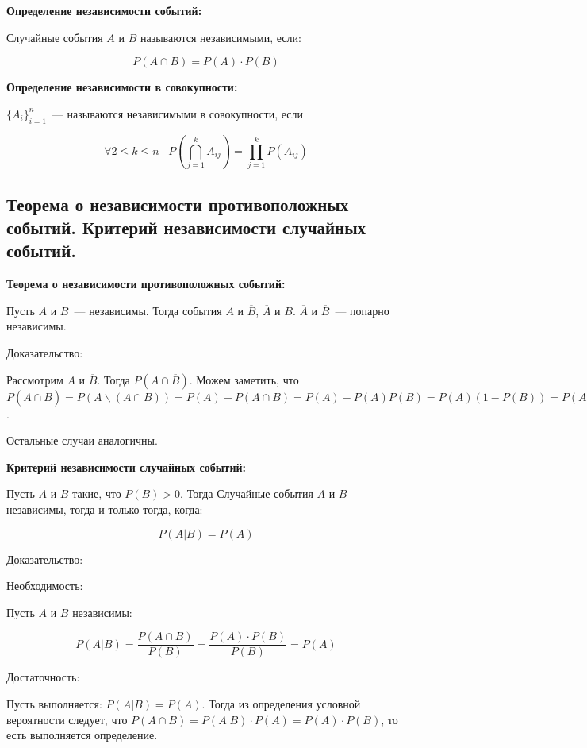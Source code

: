 \textbf{Определение независимости событий:}
    \smallskip

    Случайные события $A$ и $B$ называются независимыми, если:

    \[
        P(A \cap B) = P(A) \cdot P(B)   
    \]
    \bigskip

\textbf{Определение независимости в совокупности:}
    \smallskip

    $\{A_i\}^{n}_{i = 1}$~--- называются независимыми в совокупности, если

    \[
        \forall 2 \leq k \leq n \;\;\; P (\bigcap^{k}_{j = 1}A_{ij}) =
        \prod^{k}_{j = 1} P(A_{ij}) 
    \]

\subsection{Теорема о независимости противоположных событий. Критерий
независимости случайных событий.}

\textbf{Теорема о независимости противоположных событий:}
    \smallskip

    Пусть $A$ и $B$~--- независимы. Тогда события $A$ и $\overline{B}$,
    $\overline{A}$ и $B$. $\overline{A}$ и $\overline{B}$~--- попарно
    независимы.
    \bigskip

    Доказательство:
    \bigskip

    Рассмотрим $A$ и $\overline{B}$. Тогда $P(A \cap 
    \overline{B})$. Можем заметить, что $P(A \cap \overline{B}) = 
    P(A \backslash (A \cap B)) = P(A) - P(A \cap B) = P(A) - P(A) P(B) =
    P(A)(1 - P(B)) = P(A) P(\overline{B})$.

    Остальные случаи аналогичны.
    \bigskip

\textbf{Критерий независимости случайных событий:}
    \smallskip

    Пусть $A$ и $B$ такие, что $P(B) > 0$. Тогда Случайные
    события $A$ и $B$ независимы, тогда и только тогда, когда:

    \[
        P(A|B) = P(A)  
    \]
    \bigskip

    Доказательство:
    \bigskip

    Необходимость:
    \smallskip

    Пусть $A$ и $B$ независимы:

    \[
        P(A|B) = \frac{P(A \cap B)}{P(B)} = \frac{P(A) \cdot P(B)}{P(B)} = P(A)  
    \]
    \bigskip

    Достаточность:
    \smallskip

    Пусть выполняется: $P(A|B) = P(A)$. Тогда из определения условной вероятности
    следует, что $P(A \cap B) = P(A|B) \cdot P(A) = P(A) \cdot P(B)$,
    то есть выполняется определение.

